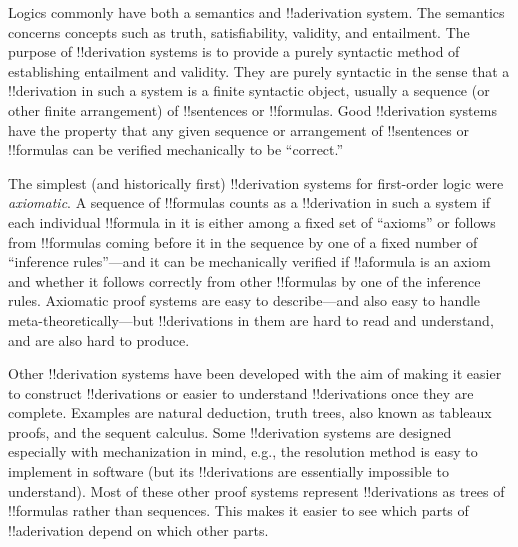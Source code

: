 \documentclass[../../../include/open-logic-section]{subfiles}
\begin{document}


Logics commonly have both a semantics and !!a{derivation}
system. The semantics concerns concepts such as truth, satisfiability,
validity, and entailment.  The purpose of !!{derivation} systems is to
provide a purely syntactic method of establishing entailment and
validity.  They are purely syntactic in the sense that a
!!{derivation} in such a system is a finite syntactic object, usually
a sequence (or other finite arrangement) of !!{sentence}s or
!!{formula}s.  Good !!{derivation} systems have the property that any
given sequence or arrangement of !!{sentence}s or !!{formula}s can be
verified mechanically to be ``correct.''  

The simplest (and historically first) !!{derivation} systems for
first-order logic were \emph{axiomatic}.  A sequence of !!{formula}s
counts as a !!{derivation} in such a system if each individual
!!{formula} in it is either among a fixed set of ``axioms'' or follows
from !!{formula}s coming before it in the sequence by one of a fixed
number of ``inference rules''---and it can be mechanically verified if
!!a{formula} is an axiom and whether it follows correctly from other
!!{formula}s by one of the inference rules.  Axiomatic proof systems
are easy to describe---and also easy to handle
meta-theoretically---but !!{derivation}s in them are hard to read and
understand, and are also hard to produce.

Other !!{derivation} systems have been developed with the aim of making it
easier to construct !!{derivation}s or easier to understand
!!{derivation}s once they are complete.  Examples are natural
deduction, truth trees, also known as tableaux proofs, and the sequent
calculus.  Some !!{derivation} systems are designed especially with
mechanization in mind, e.g., the resolution method is easy to
implement in software (but its !!{derivation}s are essentially
impossible to understand). Most of these other proof systems represent
!!{derivation}s as trees of !!{formula}s rather than sequences. This
makes it easier to see which parts of !!a{derivation} depend on which
other parts.
\end{document}

